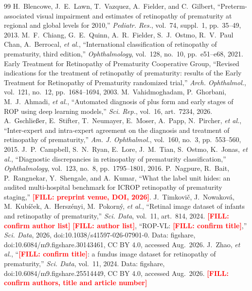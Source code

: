 \documentclass[journal]{IEEEtran}
\newcommand{\FILL}[1]{\textcolor{red}{\textbf{[FILL: #1]}}}
\begin{document}
\begin{thebibliography}{99}
 H.~Blencowe, J.~E.~Lawn, T.~Vazquez, A.~Fielder, and C.~Gilbert, ``Preterm-associated visual impairment and estimates of retinopathy of prematurity at regional and global levels for 2010,'' \emph{Pediatr. Res.}, vol.~74, suppl.~1, pp.~35--49, 2013.
 M.~F.~Chiang, G.~E.~Quinn, A.~R.~Fielder, S.~J.~Ostmo, R.~V.~Paul Chan, A.~Berrocal, \emph{et al.}, ``International classification of retinopathy of prematurity, third edition,'' \emph{Ophthalmology}, vol.~128, no.~10, pp.~e51--e68, 2021.
 Early Treatment for Retinopathy of Prematurity Cooperative Group, ``Revised indications for the treatment of retinopathy of prematurity: results of the Early Treatment for Retinopathy of Prematurity randomized trial,'' \emph{Arch. Ophthalmol.}, vol.~121, no.~12, pp.~1684--1694, 2003.
 M.~Vahidmoghadam, P.~Ghorbani, M.~J.~Ahmadi, \emph{et al.}, ``Automated diagnosis of plus form and early stages of ROP using deep learning models,'' \emph{Sci. Rep.}, vol.~16, art.~7234, 2026.
 A.~Gschlie\ss{}er, E.~Stifter, T.~Neumayer, E.~Moser, A.~Papp, N.~Pircher, \emph{et al.}, ``Inter-expert and intra-expert agreement on the diagnosis and treatment of retinopathy of prematurity,'' \emph{Am. J. Ophthalmol.}, vol.~160, no.~3, pp.~553--560, 2015.
 J.~P.~Campbell, S.~N.~Ryan, E.~Lore, J.~M.~Tian, S.~Ostmo, K.~Jonas, \emph{et al.}, ``Diagnostic discrepancies in retinopathy of prematurity classification,'' \emph{Ophthalmology}, vol.~123, no.~8, pp.~1795--1801, 2016.
 P.~Nagpure, R.~Bait, P.~Rangnekar, Y.~Shengale, and A.~Kumar, ``What the label unit hides: an audited multi-hospital benchmark for ICROP retinopathy of prematurity staging,'' \FILL{preprint venue, DOI, 2026}.
 J.~Timkovi\v{c}, J.~Nowakov\'a, M.~Kub\'i\v{c}ek, A.~Hersz\'enyi, M.~Pokorn\'y, \emph{et al.}, ``Retinal image dataset of infants and retinopathy of prematurity,'' \emph{Sci. Data}, vol.~11, art.~814, 2024. \FILL{confirm author list}
 \FILL{author list}, ``ROP-VL: \FILL{confirm title},'' \emph{Sci. Data}, 2026, doi:10.1038/s41597-026-07901-0. Data: figshare, doi:10.6084/m9.figshare.30143461, CC BY 4.0, accessed Aug.\ 2026.
 J.~Zhao, \emph{et al.}, ``\FILL{confirm title}: a fundus image dataset for retinopathy of prematurity,'' \emph{Sci. Data}, vol.~11, 2024. Data: figshare, doi:10.6084/m9.figshare.25514449, CC BY 4.0, accessed Aug.\ 2026. \FILL{confirm authors, title and article number}

\end{thebibliography}
\end{document}
